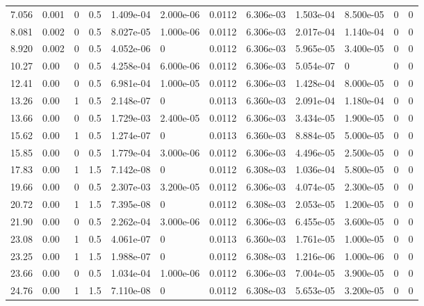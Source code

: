 \documentclass[preview]{standalone}
\begin{document}
{{\begin{tabular}{L{1.2cm}C{1.2cm} C{0.3cm}C{0.5cm} C{1.4cm}C{1.4cm} C{1.4cm}C{1.4cm} C{1.6cm}C{1.6cm} C{1.6cm}C{1.6cm}}
  7.056  &  0.001  & 0     & 0.5 &  1.409e-04  & 2.000e-06  &  0.0112&   6.306e-03& 1.503e-04 & 8.500e-05   &  0 & 0  \\ 
  8.081  &  0.002  & 0     & 0.5 &  8.027e-05  & 1.000e-06  &  0.0112&   6.306e-03& 2.017e-04 & 1.140e-04   &  0 & 0  \\ 
  8.920  &  0.002  & 0     & 0.5 &  4.052e-06  & 0  &  0.0112&   6.306e-03& 5.965e-05 & 3.400e-05   &  0 & 0  \\ 
  10.27  &  0.00  & 0     & 0.5 &  4.258e-04  & 6.000e-06  &  0.0112&   6.306e-03& 5.054e-07 & 0   &  0 & 0  \\ 
  12.41  &  0.00  & 0     & 0.5 &  6.981e-04  & 1.000e-05  &  0.0112&   6.306e-03& 1.428e-04 & 8.000e-05   &  0 & 0  \\ 
  13.26  &  0.00  & 1     & 0.5 &  2.148e-07  & 0  &  0.0113&   6.360e-03& 2.091e-04 & 1.180e-04   &  0 & 0  \\ 
  13.66  &  0.00  & 0     & 0.5 &  1.729e-03  & 2.400e-05  &  0.0112&   6.306e-03& 3.434e-05 & 1.900e-05   &  0 & 0  \\ 
  15.62  &  0.00  & 1     & 0.5 &  1.274e-07  & 0  &  0.0113&   6.360e-03& 8.884e-05 & 5.000e-05   &  0 & 0  \\ 
  15.85  &  0.00  & 0     & 0.5 &  1.779e-04  & 3.000e-06  &  0.0112&   6.306e-03& 4.496e-05 & 2.500e-05   &  0 & 0  \\ 
  17.83  &  0.00  & 1     & 1.5 &  7.142e-08  & 0  &  0.0112&   6.308e-03& 1.036e-04 & 5.800e-05   &  0 & 0  \\ 
  19.66  &  0.00  & 0     & 0.5 &  2.307e-03  & 3.200e-05  &  0.0112&   6.306e-03& 4.074e-05 & 2.300e-05   &  0 & 0  \\ 
  20.72  &  0.00  & 1     & 1.5 &  7.395e-08  & 0  &  0.0112&   6.308e-03& 2.053e-05 & 1.200e-05   &  0 & 0  \\ 
  21.90  &  0.00  & 0     & 0.5 &  2.262e-04  & 3.000e-06  &  0.0112&   6.306e-03& 6.455e-05 & 3.600e-05   &  0 & 0  \\ 
  23.08  &  0.00  & 1     & 0.5 &  4.061e-07  & 0  &  0.0113&   6.360e-03& 1.761e-05 & 1.000e-05   &  0 & 0  \\ 
  23.25  &  0.00  & 1     & 1.5 &  1.988e-07  & 0  &  0.0112&   6.308e-03& 1.216e-06 & 1.000e-06   &  0 & 0  \\ 
  23.66  &  0.00  & 0     & 0.5 &  1.034e-04  & 1.000e-06  &  0.0112&   6.306e-03& 7.004e-05 & 3.900e-05   &  0 & 0  \\ 
  24.76  &  0.00  & 1     & 1.5 &  7.110e-08  & 0  &  0.0112&   6.308e-03& 5.653e-05 & 3.200e-05   &  0 & 0  \\ 

\end{tabular}}}
\end{document}
